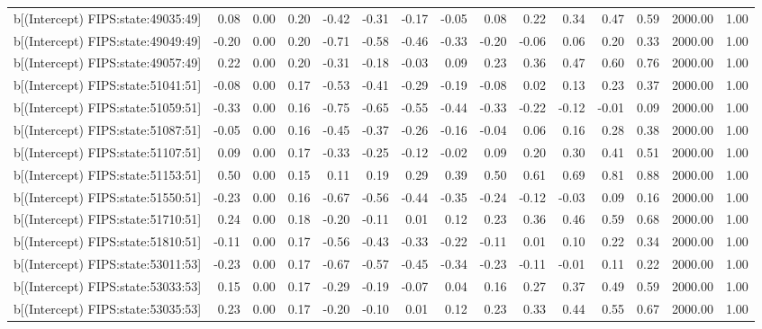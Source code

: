\begin{table}[ht]
\begin{tabular}{rrrrrrrrrrrrrrr}
  b[(Intercept) FIPS:state:49035:49] & 0.08 & 0.00 & 0.20 & -0.42 & -0.31 & -0.17 & -0.05 & 0.08 & 0.22 & 0.34 & 0.47 & 0.59 & 2000.00 & 1.00 \\ 
  b[(Intercept) FIPS:state:49049:49] & -0.20 & 0.00 & 0.20 & -0.71 & -0.58 & -0.46 & -0.33 & -0.20 & -0.06 & 0.06 & 0.20 & 0.33 & 2000.00 & 1.00 \\ 
  b[(Intercept) FIPS:state:49057:49] & 0.22 & 0.00 & 0.20 & -0.31 & -0.18 & -0.03 & 0.09 & 0.23 & 0.36 & 0.47 & 0.60 & 0.76 & 2000.00 & 1.00 \\ 
  b[(Intercept) FIPS:state:51041:51] & -0.08 & 0.00 & 0.17 & -0.53 & -0.41 & -0.29 & -0.19 & -0.08 & 0.02 & 0.13 & 0.23 & 0.37 & 2000.00 & 1.00 \\ 
  b[(Intercept) FIPS:state:51059:51] & -0.33 & 0.00 & 0.16 & -0.75 & -0.65 & -0.55 & -0.44 & -0.33 & -0.22 & -0.12 & -0.01 & 0.09 & 2000.00 & 1.00 \\ 
  b[(Intercept) FIPS:state:51087:51] & -0.05 & 0.00 & 0.16 & -0.45 & -0.37 & -0.26 & -0.16 & -0.04 & 0.06 & 0.16 & 0.28 & 0.38 & 2000.00 & 1.00 \\ 
  b[(Intercept) FIPS:state:51107:51] & 0.09 & 0.00 & 0.17 & -0.33 & -0.25 & -0.12 & -0.02 & 0.09 & 0.20 & 0.30 & 0.41 & 0.51 & 2000.00 & 1.00 \\ 
  b[(Intercept) FIPS:state:51153:51] & 0.50 & 0.00 & 0.15 & 0.11 & 0.19 & 0.29 & 0.39 & 0.50 & 0.61 & 0.69 & 0.81 & 0.88 & 2000.00 & 1.00 \\ 
  b[(Intercept) FIPS:state:51550:51] & -0.23 & 0.00 & 0.16 & -0.67 & -0.56 & -0.44 & -0.35 & -0.24 & -0.12 & -0.03 & 0.09 & 0.16 & 2000.00 & 1.00 \\ 
  b[(Intercept) FIPS:state:51710:51] & 0.24 & 0.00 & 0.18 & -0.20 & -0.11 & 0.01 & 0.12 & 0.23 & 0.36 & 0.46 & 0.59 & 0.68 & 2000.00 & 1.00 \\ 
  b[(Intercept) FIPS:state:51810:51] & -0.11 & 0.00 & 0.17 & -0.56 & -0.43 & -0.33 & -0.22 & -0.11 & 0.01 & 0.10 & 0.22 & 0.34 & 2000.00 & 1.00 \\ 
  b[(Intercept) FIPS:state:53011:53] & -0.23 & 0.00 & 0.17 & -0.67 & -0.57 & -0.45 & -0.34 & -0.23 & -0.11 & -0.01 & 0.11 & 0.22 & 2000.00 & 1.00 \\ 
  b[(Intercept) FIPS:state:53033:53] & 0.15 & 0.00 & 0.17 & -0.29 & -0.19 & -0.07 & 0.04 & 0.16 & 0.27 & 0.37 & 0.49 & 0.59 & 2000.00 & 1.00 \\ 
  b[(Intercept) FIPS:state:53035:53] & 0.23 & 0.00 & 0.17 & -0.20 & -0.10 & 0.01 & 0.12 & 0.23 & 0.33 & 0.44 & 0.55 & 0.67 & 2000.00 & 1.00 \\ 

\end{tabular}
\end{table}
